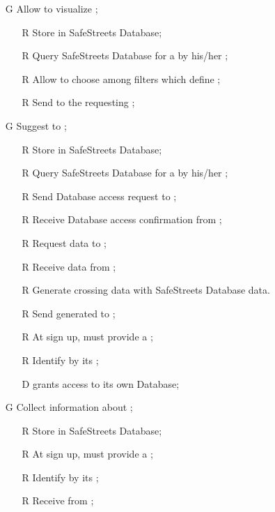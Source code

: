 \documentclass[../../../rasd.tex]{subfiles}
\begin{document}
\begin{itemize}
	\item[G\subs{5}]Allow  to visualize ;
	\begin{itemize}
		\item[R\subs{10}]Store  in SafeStreets Database;
		\item[R\subs{13}]Query SafeStreets Database for a  by his/her ;
		\item[R\subs{23}]Allow  to choose among filters which define ;
		\item[R\subs{24}]Send  to the requesting ;
	\end{itemize}

	\item[G\subs{6}]Suggest  to ;
	\begin{itemize}
		\item[R\subs{10}]Store  in SafeStreets Database;
		\item[R\subs{13}]Query SafeStreets Database for a  by his/her ;
		\item[R\subs{25}]Send  Database access request to ; 
		\item[R\subs{26}]Receive  Database access confirmation from ;
		\item[R\subs{27}]Request  data to ;
		\item[R\subs{28}]Receive  data from ;
		\item[R\subs{29}]Generate  crossing   data with SafeStreets Database data.
		\item[R\subs{30}]Send generated  to ;
		\item[R\subs{31}]At sign up,  must provide a ;
		\item[R\subs{32}]Identify  by its ;
		\\
		\item[D\subs{8}] grants access to its own  Database;
	\end{itemize}

	\item[G\subs{7}]Collect information about ;
	\begin{itemize}
		\item[R\subs{12}]Store  in SafeStreets Database;
		\item[R\subs{31}]At sign up,  must provide a ;
		\item[R\subs{32}]Identify  by its ;
		\item[R\subs{33}]Receive  from ;
	\end{itemize}


\end{itemize}
\end{document}
